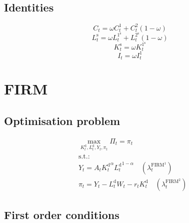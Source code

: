 \subsection{Identities}

\begin{equation}
C_{t} = {\omega} {C^{\mathrm{1}}_{t}} + {C^{\mathrm{2}}_{t}} \left(1 - \omega\right)
\end{equation}
\begin{equation}
L^{\mathrm{s}}_{t} = {\omega} {L^{\mathrm{1}^{\mathrm{s}}}_{t}} + {L^{\mathrm{2}^{\mathrm{s}}}_{t}} \left(1 - \omega\right)
\end{equation}
\begin{equation}
K^{\mathrm{s}}_{t} = {\omega} {K^{\mathrm{1}^{\mathrm{s}}}_{t}}
\end{equation}
\begin{equation}
I_{t} = {\omega} {I^{\mathrm{1}}_{t}}
\end{equation}




\section{FIRM}

\subsection{Optimisation problem}

\begin{align}
&\max_{K^{\mathrm{d}}_{t}, L^{\mathrm{d}}_{t}, Y_{t}, \pi_{t}
} \Pi_{t} = \pi_{t}\\
&\mathrm{s.t.:}\nonumber\\
& Y_{t} = {A_{t}} {{K^{\mathrm{d}}_{t}}^{\alpha}} {{L^{\mathrm{d}}_{t}}^{1 - \alpha}} \quad \left(\lambda^{\mathrm{FIRM}^{\mathrm{1}}}_{t}\right)\\
& \pi_{t} = Y_{t} - {L^{\mathrm{d}}_{t}} {W_{t}} - {r_{t}} {K^{\mathrm{d}}_{t}} \quad \left(\lambda^{\mathrm{FIRM}^{\mathrm{2}}}_{t}\right)
\end{align}


\subsection{First order conditions}

